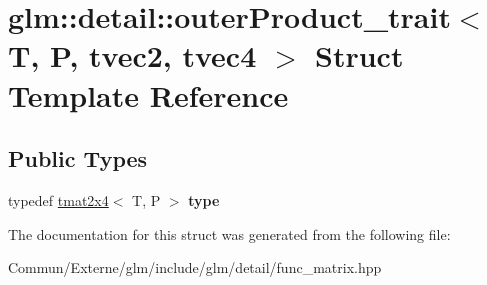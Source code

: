 \hypertarget{structglm_1_1detail_1_1outer_product__trait_3_01_t_00_01_p_00_01tvec2_00_01tvec4_01_4}{}\section{glm\+:\+:detail\+:\+:outer\+Product\+\_\+trait$<$ T, P, tvec2, tvec4 $>$ Struct Template Reference}
\label{structglm_1_1detail_1_1outer_product__trait_3_01_t_00_01_p_00_01tvec2_00_01tvec4_01_4}
\subsection*{Public Types}
\begin{DoxyCompactItemize}
\item 
typedef \hyperlink{structglm_1_1detail_1_1tmat2x4}{tmat2x4}$<$ T, P $>$ {\bfseries type}\hypertarget{structglm_1_1detail_1_1outer_product__trait_3_01_t_00_01_p_00_01tvec2_00_01tvec4_01_4_a5ca49ab58d1c30d858b622c06147cd57}{}\label{structglm_1_1detail_1_1outer_product__trait_3_01_t_00_01_p_00_01tvec2_00_01tvec4_01_4_a5ca49ab58d1c30d858b622c06147cd57}

\end{DoxyCompactItemize}


The documentation for this struct was generated from the following file\+:\begin{DoxyCompactItemize}
\item 
Commun/\+Externe/glm/include/glm/detail/func\+\_\+matrix.\+hpp\end{DoxyCompactItemize}
